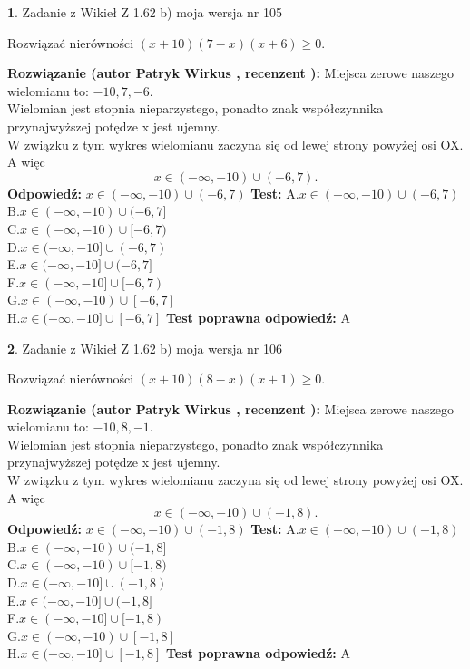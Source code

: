 \documentclass[12pt, a4paper]{article}
\theoremstyle{definition} %
\newtheorem{zad}{}
\newcommand{\zadStart}[1]{\begin{zad}#1\newline}
\newcommand{\zadStop}{\end{zad}}
\newcommand{\rozwStart}[2]{\noindent \textbf{Rozwiązanie (autor #1 , recenzent #2): }\newline}
\newcommand{\rozwStop}{\newline}
\newcommand{\odpStart}{\noindent \textbf{Odpowiedź:}\newline}
\newcommand{\odpStop}{\newline}
\newcommand{\testStart}{\noindent \textbf{Test:}\newline}
\newcommand{\testStop}{\newline}
\newcommand{\kluczStart}{\noindent \textbf{Test poprawna odpowiedź:}\newline}
\newcommand{\kluczStop}{\newline}
\begin{document}
\zadStart{Zadanie z Wikieł Z 1.62 b) moja wersja nr 105}

Rozwiązać nierówności $(x+10)(7-x)(x+6)\ge0$.
\zadStop
\rozwStart{Patryk Wirkus}{}
Miejsca zerowe naszego wielomianu to: $-10, 7, -6$.\\
Wielomian jest stopnia nieparzystego, ponadto znak współczynnika przy\linebreak najwyższej potędze x jest ujemny.\\ W związku z tym wykres wielomianu zaczyna się od lewej strony powyżej osi OX. A więc $$x \in (-\infty,-10) \cup (-6,7).$$
\rozwStop
\odpStart
$x \in (-\infty,-10) \cup (-6,7)$
\odpStop
\testStart
A.$x \in (-\infty,-10) \cup (-6,7)$\\
B.$x \in (-\infty,-10) \cup (-6,7]$\\
C.$x \in (-\infty,-10) \cup [-6,7)$\\
D.$x \in (-\infty,-10] \cup (-6,7)$\\
E.$x \in (-\infty,-10] \cup (-6,7]$\\
F.$x \in (-\infty,-10] \cup [-6,7)$\\
G.$x \in (-\infty,-10) \cup [-6,7]$\\
H.$x \in (-\infty,-10] \cup [-6,7]$
\testStop
\kluczStart
A
\kluczStop



\zadStart{Zadanie z Wikieł Z 1.62 b) moja wersja nr 106}

Rozwiązać nierówności $(x+10)(8-x)(x+1)\ge0$.
\zadStop
\rozwStart{Patryk Wirkus}{}
Miejsca zerowe naszego wielomianu to: $-10, 8, -1$.\\
Wielomian jest stopnia nieparzystego, ponadto znak współczynnika przy\linebreak najwyższej potędze x jest ujemny.\\ W związku z tym wykres wielomianu zaczyna się od lewej strony powyżej osi OX. A więc $$x \in (-\infty,-10) \cup (-1,8).$$
\rozwStop
\odpStart
$x \in (-\infty,-10) \cup (-1,8)$
\odpStop
\testStart
A.$x \in (-\infty,-10) \cup (-1,8)$\\
B.$x \in (-\infty,-10) \cup (-1,8]$\\
C.$x \in (-\infty,-10) \cup [-1,8)$\\
D.$x \in (-\infty,-10] \cup (-1,8)$\\
E.$x \in (-\infty,-10] \cup (-1,8]$\\
F.$x \in (-\infty,-10] \cup [-1,8)$\\
G.$x \in (-\infty,-10) \cup [-1,8]$\\
H.$x \in (-\infty,-10] \cup [-1,8]$
\testStop
\kluczStart
A
\kluczStop
\end{document}
